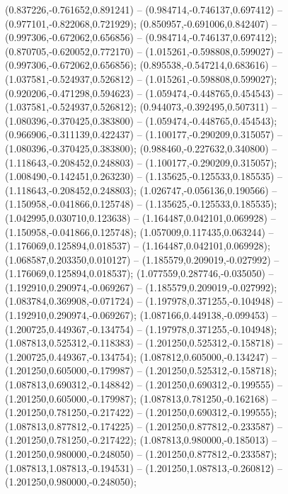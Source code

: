  (0.837226,-0.761652,0.891241) -- (0.984714,-0.746137,0.697412) -- (0.977101,-0.822068,0.721929);
 (0.850957,-0.691006,0.842407) -- (0.997306,-0.672062,0.656856) -- (0.984714,-0.746137,0.697412);
 (0.870705,-0.620052,0.772170) -- (1.015261,-0.598808,0.599027) -- (0.997306,-0.672062,0.656856);
 (0.895538,-0.547214,0.683616) -- (1.037581,-0.524937,0.526812) -- (1.015261,-0.598808,0.599027);
 (0.920206,-0.471298,0.594623) -- (1.059474,-0.448765,0.454543) -- (1.037581,-0.524937,0.526812);
 (0.944073,-0.392495,0.507311) -- (1.080396,-0.370425,0.383800) -- (1.059474,-0.448765,0.454543);
 (0.966906,-0.311139,0.422437) -- (1.100177,-0.290209,0.315057) -- (1.080396,-0.370425,0.383800);
 (0.988460,-0.227632,0.340800) -- (1.118643,-0.208452,0.248803) -- (1.100177,-0.290209,0.315057);
 (1.008490,-0.142451,0.263230) -- (1.135625,-0.125533,0.185535) -- (1.118643,-0.208452,0.248803);
 (1.026747,-0.056136,0.190566) -- (1.150958,-0.041866,0.125748) -- (1.135625,-0.125533,0.185535);
 (1.042995,0.030710,0.123638) -- (1.164487,0.042101,0.069928) -- (1.150958,-0.041866,0.125748);
 (1.057009,0.117435,0.063244) -- (1.176069,0.125894,0.018537) -- (1.164487,0.042101,0.069928);
 (1.068587,0.203350,0.010127) -- (1.185579,0.209019,-0.027992) -- (1.176069,0.125894,0.018537);
 (1.077559,0.287746,-0.035050) -- (1.192910,0.290974,-0.069267) -- (1.185579,0.209019,-0.027992);
 (1.083784,0.369908,-0.071724) -- (1.197978,0.371255,-0.104948) -- (1.192910,0.290974,-0.069267);
 (1.087166,0.449138,-0.099453) -- (1.200725,0.449367,-0.134754) -- (1.197978,0.371255,-0.104948);
 (1.087813,0.525312,-0.118383) -- (1.201250,0.525312,-0.158718) -- (1.200725,0.449367,-0.134754);
 (1.087812,0.605000,-0.134247) -- (1.201250,0.605000,-0.179987) -- (1.201250,0.525312,-0.158718);
 (1.087813,0.690312,-0.148842) -- (1.201250,0.690312,-0.199555) -- (1.201250,0.605000,-0.179987);
 (1.087813,0.781250,-0.162168) -- (1.201250,0.781250,-0.217422) -- (1.201250,0.690312,-0.199555);
 (1.087813,0.877812,-0.174225) -- (1.201250,0.877812,-0.233587) -- (1.201250,0.781250,-0.217422);
 (1.087813,0.980000,-0.185013) -- (1.201250,0.980000,-0.248050) -- (1.201250,0.877812,-0.233587);
 (1.087813,1.087813,-0.194531) -- (1.201250,1.087813,-0.260812) -- (1.201250,0.980000,-0.248050);
